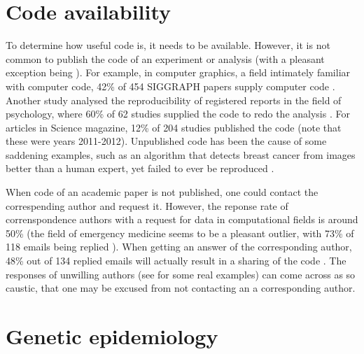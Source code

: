 \section{Code availability}\label{sec:code-availability}

To determine how useful code is, it needs to be available.
However, it is not common to publish the code of an experiment or analysis 
\cite{stodden2011trust,read2015sizing} (with a pleasant exception 
being \cite{conesa2019making}).
For example, in computer graphics, 
a field intimately familiar with computer code,
42\% of 454 SIGGRAPH papers supply computer code \cite{bonneel2020code}.
Another study analysed the reproducibility of registered reports
in the field of psychology, 
where 60\% of 62 studies supplied the code 
to redo the analysis \cite{obels2020analysis}.
For articles in Science magazine, 12\% of 204
studies published the code \cite{stodden2018empirical} 
(note that these were years 2011-2012).
Unpublished code has been the cause of some saddening examples,
such as an algorithm that detects breast cancer from images 
better than a human expert, 
yet failed to ever be reproduced \cite{haibe2020importance}.


When code of an academic paper is not published, 
one could contact the correspending author and request it.
However, the reponse rate of correnspondence authors 
with a request for data in computational fields is around 50\% 
\cite{manca2018non, stodden2018empirical, teunis2015corresponding} 
(the field of emergency medicine seems to be a pleasant outlier, 
with 73\% of 118 emails being replied \cite{o2003email}).
When getting an answer of the corresponding author, 
48\% out of 134 replied emails will actually result 
in a sharing of the code \cite{stodden2018empirical}.
The responses of unwilling authors (see \cite{stodden2018empirical} for 
some real examples) can come across as so caustic, 
that one may be excused from not contacting an a corresponding author.

\section{Genetic epidemiology}

